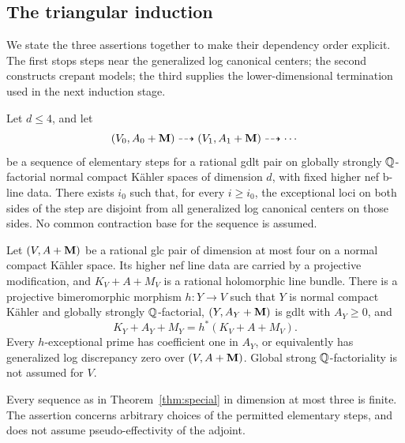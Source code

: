 \subsection{The triangular induction}

We state the three assertions together to make their dependency order
explicit.  The first stops steps near the generalized log canonical
centers; the second constructs crepant models; the third supplies the
lower-dimensional termination used in the next induction stage.

\begin{theorem}\label{thm:special}
Let $d\leq4$, and let
\[
 (V_0,A_0+\mathbf M)\dashrightarrow(V_1,A_1+\mathbf M)
 \dashrightarrow\cdots
\]
be a sequence of elementary steps for a rational gdlt pair
on globally strongly $\mathbb Q$-factorial normal compact K\"ahler
spaces of dimension $d$, with fixed higher nef b-line data.
There exists $i_0$ such that, for every $i\geq i_0$, the
exceptional loci on both sides of the step are disjoint
from all generalized log canonical centers on those sides.
No common contraction base for the sequence is assumed.
\end{theorem}

\begin{proposition}
\label{prop:gdlt-mod}
Let $(V,A+\mathbf M)$ be a rational glc pair of dimension at most
four on a normal compact K\"ahler space.  Its higher nef
line data are carried by a projective modification, and
$K_V+A+M_V$ is a rational holomorphic line bundle.
There is a projective bimeromorphic morphism $h:Y\to V$
such that $Y$ is normal compact K\"ahler and globally
strongly $\mathbb Q$-factorial, $(Y,A_Y+\mathbf M)$ is gdlt with
$A_Y\geq0$, and
\[
 K_Y+A_Y+M_Y=h^*(K_V+A+M_V).
\]
Every $h$-exceptional prime has coefficient one in $A_Y$,
or equivalently has generalized log discrepancy zero over
$(V,A+\mathbf M)$.  Global strong $\mathbb Q$-factoriality is not assumed
for $V$.
\end{proposition}

\begin{theorem}
\label{thm:gdlt-three}
Every sequence as in Theorem~\ref{thm:special} in dimension
at most three is finite.  The assertion concerns arbitrary
choices of the permitted elementary steps, and does not
assume pseudo-effectivity of the adjoint.
\end{theorem}

